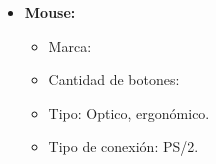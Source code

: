 \begin{enumerate}
\begin{itemize}
    \item \textbf{Mouse:}
    \begin{itemize}
      \item Marca:
      \item Cantidad de botones:
      \item Tipo: Optico, ergonómico.
      \item Tipo de conexión: PS/2.
    \end{itemize}
  \end{itemize}
\end{enumerate}
